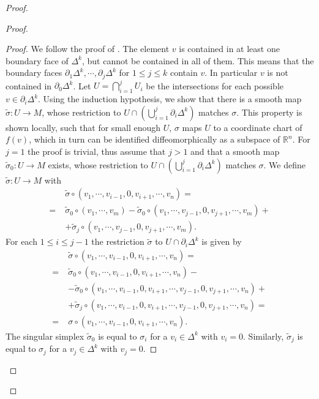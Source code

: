 \documentclass[envcountsect,runningheads]{llncs}
\begin{document}
\begin{proof}
\begin{proof}
\begin{proof}
We follow the proof of \cite[Lem.~2.1]{parkproof}. The element $v$ is contained in at least one boundary face of $\Delta^k$, but cannot be contained in all of them. This means that the boundary faces $\partial_1 \Delta^k, \cdots, \partial_j \Delta^k$ for $1 \leq j \leq k$ contain $v$. In particular $v$ is not contained in $\partial_0 \Delta^k$. Let $U = \bigcap_{i=1}^{j} U_i$ be the intersections for each possible $v \in \partial_i\Delta^k$. Using the induction hypothesis, we show that there is a smooth map $\tilde{\sigma}: U \rightarrow M$, whose restriction to $U \cap \left (\bigcup_{i=1}^j \partial_i \Delta^k \right)$ matches $\sigma$. This property is shown locally, such that for small enough $U$, $\sigma$ maps $U$ to a coordinate chart of $f(v)$, which in turn can be identified diffeomorphically as a subspace of $\mathbb{R}^n$. For $j=1$ the proof is trivial, thus assume that $j > 1$ and that a smooth map $\tilde{\sigma}_0 : U \rightarrow M$ exists, whose restriction to $U \cap \left( \bigcup_{i=1}^j \partial_i \Delta^k \right)$ matches $\sigma$. We define $\tilde{\sigma}: U \rightarrow M$ with
\begin{align}
	&\tilde{\sigma} \circ \left(v_1,\cdots,v_{i-1},0,v_{i+1},\cdots,v_n\right) = \\
	= \; &\tilde{\sigma}_0 \circ \left( v_1, \cdots, v_m\right) - \tilde{\sigma}_0 \circ  \left(v_1,\cdots,v_{j-1},0,v_{j+1},\cdots,v_m \right) + \\
	& + \tilde{\sigma}_j\circ \left(v_1,\cdots,v_{j-1},0,v_{j+1},\cdots,v_m \right).
\end{align}
For each $1 \leq i \leq j -1$ the restriction $\tilde{\sigma}$ to $U \cap \partial_i \Delta^k$ is given by
\begin{align}
&\tilde{\sigma} \circ \left(v_1,\cdots,v_{i-1},0,v_{i+1},\cdots, v_n\right) = \\
= \; &\tilde{\sigma}_0 \circ \left(v_1, \cdots, v_{i-1}, 0, v_{i+1}, \cdots, v_n\right) - \\
&- \tilde{\sigma}_0 \circ \left(v_1, \cdots, v_{i-1}, 0, v_{i+1}, \cdots,v_{j-1},0,v_{j+1},\cdots, v_n\right) + \\
&+ \tilde{\sigma}_j \circ \left(v_1, \cdots, v_{i-1}, 0, v_{i+1}, \cdots,v_{j-1},0,v_{j+1}, \cdots, v_n\right) = \\
= \; &\sigma \circ \left(v_1, \cdots, v_{i-1}, 0, v_{i+1}, \cdots, v_n\right).
\end{align}
The singular simplex $\tilde{\sigma}_0$ is equal to $\sigma_i$ for a $v_i \in \Delta^k$ with $v_i = 0$. Similarly, $\tilde{\sigma}_j$ is equal to $\sigma_j$ for a $v_j \in \Delta^k$ with $v_j = 0$.


\end{proof}
\end{proof}
\end{proof}
\end{document}

